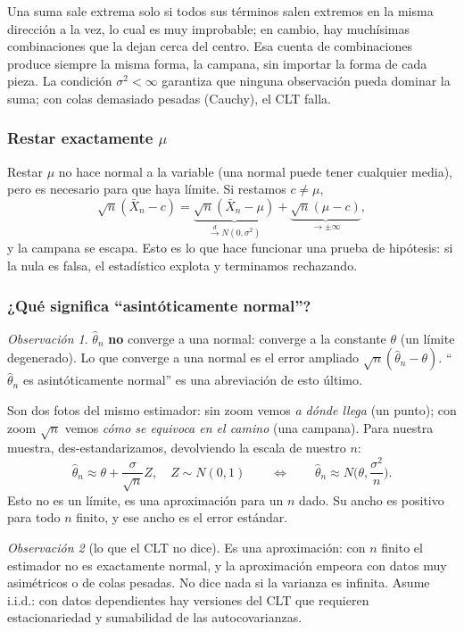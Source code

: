 \documentclass[11pt,a4paper]{article}
\theoremstyle{plain}
\theoremstyle{definition}
\theoremstyle{remark}
\newtheorem*{observacion}{Observación}
\newcommand{\cd}{\xrightarrow{\;d\;}}
\begin{document}
Una suma sale extrema solo si todos sus términos salen extremos en la misma dirección a la
vez, lo cual es muy improbable; en cambio, hay muchísimas combinaciones que la dejan cerca
del centro. Esa cuenta de combinaciones produce siempre la misma forma, la campana, sin
importar la forma de cada pieza. La condición $\sigma^2<\infty$ garantiza que ninguna
observación pueda dominar la suma; con colas demasiado pesadas (Cauchy), el CLT falla.

\subsubsection*{Restar exactamente $\mu$}

Restar $\mu$ no hace normal a la variable (una normal puede tener cualquier media), pero es
necesario para que haya límite. Si restamos $c\neq\mu$,
\[
\sqrt n(\bar X_n-c)=\underbrace{\sqrt n(\bar X_n-\mu)}_{\cd N(0,\sigma^2)}
+\underbrace{\sqrt n(\mu-c)}_{\to\pm\infty},
\]
y la campana se escapa. Esto es lo que hace funcionar una prueba de hipótesis: si la nula es
falsa, el estadístico explota y terminamos rechazando.

\subsubsection*{¿Qué significa ``asintóticamente normal''?}

\begin{observacion}
$\hat\theta_n$ \textbf{no} converge a una normal: converge a la constante $\theta$ (un límite
degenerado). Lo que converge a una normal es el error ampliado $\sqrt n(\hat\theta_n-\theta)$.
``$\hat\theta_n$ es asintóticamente normal'' es una abreviación de esto último.
\end{observacion}

Son dos fotos del mismo estimador: sin zoom vemos \emph{a dónde llega} (un punto); con zoom
$\sqrt n$ vemos \emph{cómo se equivoca en el camino} (una campana). Para nuestra muestra,
des-estandarizamos, devolviendo la escala de nuestro $n$:
\[
\hat\theta_n\approx\theta+\frac{\sigma}{\sqrt n}Z,\quad Z\sim N(0,1)
\qquad\Longleftrightarrow\qquad
\hat\theta_n\approx N\Big(\theta,\frac{\sigma^2}{n}\Big).
\]
Esto no es un límite, es una aproximación para un $n$ dado. Su ancho es positivo para todo $n$
finito, y ese ancho es el error estándar.

\begin{observacion}[lo que el CLT no dice]
Es una aproximación: con $n$ finito el estimador no es exactamente normal, y la aproximación
empeora con datos muy asimétricos o de colas pesadas. No dice nada si la varianza es infinita.
Asume i.i.d.: con datos dependientes hay versiones del CLT que requieren estacionariedad y
sumabilidad de las autocovarianzas.
\end{observacion}
\end{document}
